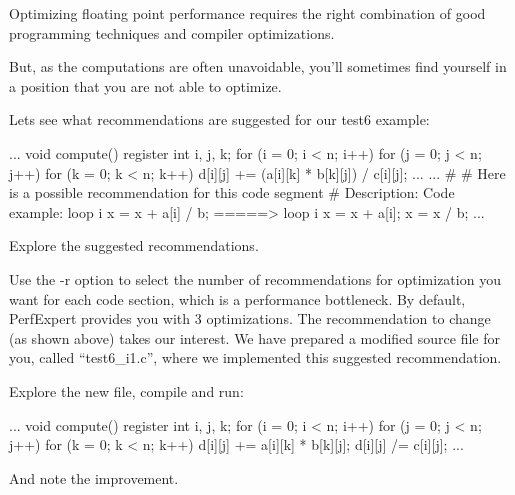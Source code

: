Optimizing floating point performance requires the right combination of good programming techniques and compiler optimizations.

But, as the computations are often unavoidable, you'll sometimes find yourself in a position that you are not able to optimize.

Lets see what recommendations are suggested for our test6 example:

\begin{prompt}
...
void compute()
{
register int i, j, k;
for (i = 0; i < n; i++)
  for (j = 0; j < n; j++) {
    for (k = 0; k < n; k++) {
      d[i][j] += (a[i][k] * b[k][j]) / c[i][j];
    }
  }
}
...
...
\#
\# Here is a possible recommendation for this code segment
\#
Description: %
Code example:
loop i {
 x = x + a[i] / b;
}
=====>
loop i {
 x = x + a[i];
}
x = x / b;
...
\end{prompt}

Explore the suggested recommendations.

Use the -r option to select the number of recommendations for optimization you want for each code section, which is a performance bottleneck. By default, PerfExpert provides you with 3 optimizations.
The recommendation to change (as shown above) takes our interest. We have prepared a modified source file for you, called ``test6\_i1.c'', where we implemented this suggested recommendation.

Explore the new file, compile and run:

\begin{prompt}
...
void compute()
{
register int i, j, k;
for (i = 0; i < n; i++)
  for (j = 0; j < n; j++) {
    for (k = 0; k < n; k++) {
      d[i][j] += a[i][k] * b[k][j];
    }
    d[i][j] /= c[i][j];
  }
}
...
\end{prompt}
And note the improvement.

